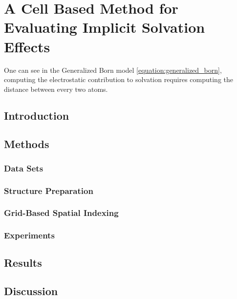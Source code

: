 \chapter[Cell Based Implicit Solvent]{A Cell Based Method for Evaluating Implicit Solvation Effects}
\label{chapter:cell_solvent}

One can see in the Generalized Born model \eqref{equation:generalized_born}, computing the electrostatic contribution to solvation requires computing the distance between every two atoms.

\section{Introduction}
\label{sec:cell/intro}



\section{Methods}
\label{sec:cell/methods}
    \subsection{Data Sets}
    \label{subsec:data_sets}
    

    \subsection{Structure Preparation}
    \label{subsec:structure_preparation}
    

    \subsection{Grid-Based Spatial Indexing}
    \label{subsec:grid_based_indexing}
    

    \subsection{Experiments}
    \label{subsec:experiments}
    


\section{Results}
\label{sec:cell/results}



\section{Discussion}
\label{sec:cell/discussion}

